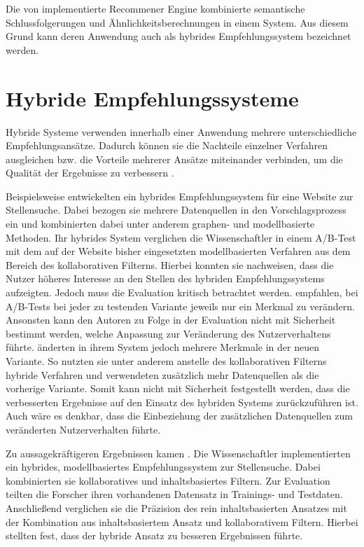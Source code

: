 Die von \textcite[S. 1]{semanticMatchmaking:2009} implementierte Recommener Engine kombinierte semantische Schlussfolgerungen und Ähnlichkeitsberechnungen in einem System. Aus diesem Grund kann deren Anwendung auch als hybrides Empfehlungssystem bezeichnet werden.

\section{Hybride Empfehlungssysteme}
\label{ch:empfehlungssysteme:hybrideEmpfehlungssysteme}
Hybride Systeme verwenden innerhalb einer Anwendung mehrere unterschiedliche Empfehlungsansätze. Dadurch können sie die Nachteile einzelner Verfahren ausgleichen bzw. die Vorteile mehrerer Ansätze miteinander verbinden, um die Qualität der Ergebnisse zu verbessern \cite[S. 199f.]{recommenderSystems:2016}\cite[S. 8]{malinowski:2008}.

Beispielsweise entwickelten \textcite[S. 1ff.]{shalaby:2017} ein hybrides Empfehlungssystem für eine Website zur Stellensuche. Dabei bezogen sie mehrere Datenquellen in den Vorschlagsprozess ein und kombinierten dabei unter anderem graphen- und modellbasierte Methoden. Ihr hybrides System verglichen die Wissenschaftler in einem A/B-Test mit dem auf der Website bisher eingesetzten modellbasierten Verfahren aus dem Bereich des kollaborativen Filterns. Hierbei konnten sie nachweisen, dass die Nutzer höheres Interesse an den Stellen des hybriden Empfehlungssystems aufzeigten. Jedoch muss die Evaluation kritisch betrachtet werden. \textcite[S. 10f.]{stegemann:2020} empfahlen, bei A/B-Tests bei jeder zu testenden Variante jeweils nur ein Merkmal zu verändern. Ansonsten kann den Autoren zu Folge in der Evaluation nicht mit Sicherheit bestimmt werden, welche Anpassung zur Veränderung des Nutzerverhaltens führte. \textcite[S. 1ff.]{shalaby:2017} änderten in ihrem System jedoch mehrere Merkmale in der neuen Variante. So nutzten sie unter anderem anstelle des kollaborativen Filterns hybride Verfahren und verwendeten zusätzlich mehr Datenquellen als die vorherige Variante. Somit kann nicht mit Sicherheit festgestellt werden, dass die verbesserten Ergebnisse auf den Einsatz des hybriden Systems zurückzuführen ist. Auch wäre es denkbar, dass die Einbeziehung der zusätzlichen Datenquellen zum veränderten Nutzerverhalten führte.

Zu aussagekräftigeren Ergebnissen kamen \textcite[S. 1ff.]{combiningCbAndCFCostSensitiveApproach:2017}. Die Wissenschaftler implementierten ein hybrides, modellbasiertes Empfehlungssystem zur Stellensuche. Dabei kombinierten sie kollaboratives und inhaltsbasiertes Filtern. Zur Evaluation teilten die Forscher ihren vorhandenen Datensatz in Trainings- und Testdaten. Anschließend verglichen sie die Präzision des rein inhaltsbasierten Ansatzes mit der Kombination aus inhaltsbasiertem Ansatz und kollaborativem Filtern. Hierbei stellten fest, dass der hybride Ansatz zu besseren Ergebnissen führte.

